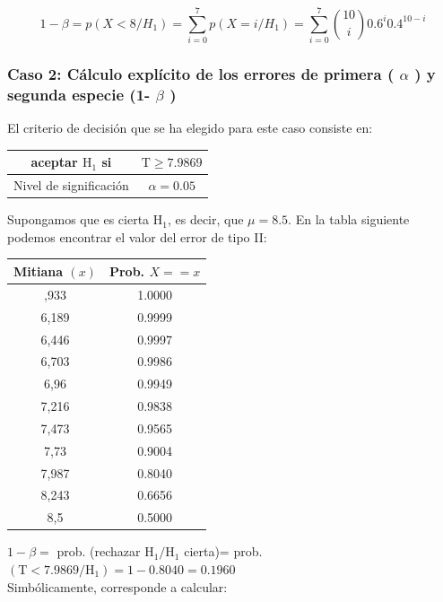 \documentclass[
]{article}
\begin{document}
\[
1-\beta=p\left(X<8 / H_{1}\right)=\sum_{i=0}^{7} p\left(X=i / H_{1}\right)=\sum_{i=0}^{7}\binom{10}{i} 0.6^{i} 0.4^{10-i}
\]

\subsubsection{\texorpdfstring{Caso 2: Cálculo explícito de los errores de primera ( \(\alpha\) ) y segunda especie (1- \(\beta\) )}{Caso 2: Cálculo explícito de los errores de primera ( \textbackslash alpha ) y segunda especie (1- \textbackslash beta )}}\label{caso-2-cuxe1lculo-expluxedcito-de-los-errores-de-primera-alpha-y-segunda-especie-1--beta}

El criterio de decisión que se ha elegido para este caso consiste en:

\begin{longtable}[]{@{}cc@{}}
\toprule\noalign{}
aceptar \(\mathrm{H}_{1}\) si & \(\mathrm{T} \geq 7.9869\) \\
\midrule\noalign{}
\endhead
\bottomrule\noalign{}
\endlastfoot
Nivel de significación & \(\alpha=0.05\) \\
\end{longtable}

Supongamos que es cierta \(\mathrm{H}_{1}\), es decir, que \(\mu=8.5\). En la tabla siguiente podemos encontrar el valor del error de tipo II:

\begin{longtable}[]{@{}cc@{}}
\toprule\noalign{}
Mitiana \((x)\) & Prob. \(X==x\) \\
\midrule\noalign{}
\endhead
\bottomrule\noalign{}
\endlastfoot
5,933 & 1.0000 \\
6,189 & 0.9999 \\
6,446 & 0.9997 \\
6,703 & 0.9986 \\
6,96 & 0.9949 \\
7,216 & 0.9838 \\
7,473 & 0.9565 \\
7,73 & 0.9004 \\
7,987 & 0.8040 \\
8,243 & 0.6656 \\
8,5 & 0.5000 \\
\end{longtable}

\(1-\beta=\) prob. (rechazar \(\mathrm{H}_{1}/\mathrm{H}_{1}\) cierta)= prob. \((\mathrm{T}<7.9869/\mathrm{H}_{1})=1-0.8040=0.1960\)\\
Simbólicamente, corresponde a calcular:
\end{document}
